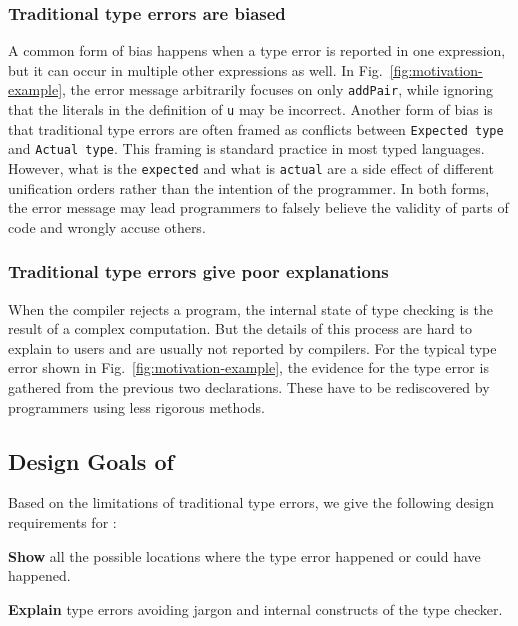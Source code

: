 \subsubsection{\textbf{Traditional type errors are biased}}
A common form of bias happens when a type error is reported in one expression, but it can occur in multiple other expressions as well. In Fig.~\ref{fig:motivation-example}, the error message arbitrarily focuses on only \texttt{addPair}, while ignoring that the literals in the definition of \texttt{u} may be incorrect. %
Another form of bias is that traditional type errors are often framed as conflicts between \texttt{Expected type} and \texttt{Actual type}. This framing is standard practice in most typed languages. However, what is the \texttt{expected} and what is \texttt{actual} are a side effect of different unification orders rather than the intention of the programmer. In both forms, the error message may lead programmers to falsely believe the validity of parts of code and wrongly accuse others.

\subsubsection{\textbf{Traditional type errors give poor explanations}}
When the compiler rejects a program, the internal state of type checking is the result of a complex computation. But the details of this process are hard to explain to users and are usually not reported by compilers. For the typical type error shown in Fig.~\ref{fig:motivation-example}, the evidence for the type error is gathered from the previous two declarations. These have to be rediscovered by programmers using less rigorous methods. 

\subsection{Design Goals of \chameleon{}}
Based on the limitations of traditional type errors, we give the following design requirements for \chameleon{}:

\noindent\textbf{Show} all the possible locations where the type error happened or could have happened.

\noindent\textbf{Explain} type errors avoiding jargon and internal constructs of the type checker.

